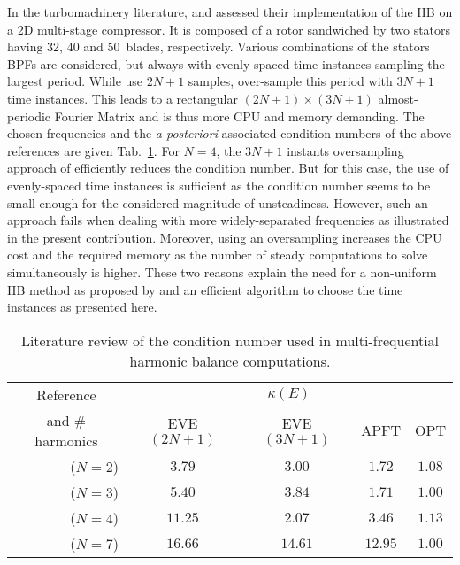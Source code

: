 
In the turbomachinery literature, \citet{Gopinath2007} and
\citet{Ekici2007} assessed their implementation of the
HB on a 2D multi-stage compressor. 
It is composed of a rotor sandwiched by two stators having
32, 40 and 50~blades, respectively. Various combinations of the stators
BPFs are considered, but always with evenly-spaced time instances sampling the
largest period.  While \citet{Gopinath2007} use $2N+1$ samples,
\citet{Ekici2007} over-sample this period with $3N+1$ time instances. This
leads to a rectangular $(2N+1)\times(3N+1)$ almost-periodic Fourier
Matrix and is thus more CPU and memory demanding. 
The chosen frequencies and the \emph{a posteriori}
associated condition numbers of the above references are given
Tab.~\ref{tab:literature_multistage}.  For $N=4$, the $3N+1$ instants
oversampling approach of \citet{Ekici2007} efficiently reduces the
condition number. But for this case, the use of evenly-spaced time
instances is sufficient as the condition number seems to be small enough
for the considered magnitude of unsteadiness.  However, such an
approach fails when dealing with more widely-separated frequencies as
illustrated in the present contribution. 
Moreover, using an oversampling increases
the CPU cost and the required memory as the number of steady computations
to solve simultaneously is higher. These two reasons explain the
need for a non-uniform HB method as proposed by \citet{JGuedeney2013}
and an efficient algorithm to choose the time instances as presented here.
\begin{table}[htb]
  \centering
  \begin{tabular}{rcccc}
    \toprule
    \multicolumn{1}{c}{Reference} & \multicolumn{4}{c}{$\kappa(E)$} \\
    \multicolumn{1}{c}{and \# harmonics} & EVE $(2N+1)$ & EVE $(3N+1)$ & APFT & OPT \\
    \midrule
    \citet{Gopinath2007} ($N=2$) & $\mathbf{3.79}$ & $3.00$ & $1.72$ & $1.08$ \\
    \citet{Ekici2007} ($N=3$) & $5.40$ & $\mathbf{3.84}$ & $1.71$ & $1.00$ \\
    \citet{Gopinath2007} ($N=4$) & $\mathbf{11.25}$ & $2.07$ & $3.46$ & $1.13$ \\
    \citet{Gopinath2007} ($N=7$) & $\mathbf{16.66}$ & $14.61$ & $12.95$ & $1.00$ \\
    \bottomrule
  \end{tabular}
  \caption{Literature review of the condition number used in multi-frequential
  harmonic balance computations.}
  \label{tab:literature_multistage}
\end{table}
